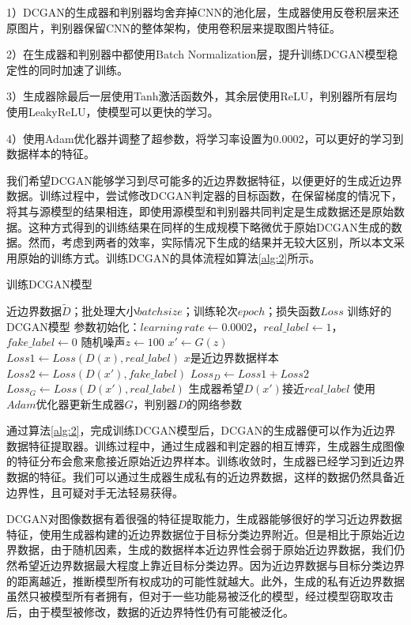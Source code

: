 1）DCGAN的生成器和判别器均舍弃掉CNN的池化层，生成器使用反卷积层来还原图片，判别器保留CNN的整体架构，使用卷积层来提取图片特征。

2）在生成器和判别器中都使用Batch Normalization层，提升训练DCGAN模型稳定性的同时加速了训练。

3）生成器除最后一层使用Tanh激活函数外，其余层使用ReLU，判别器所有层均使用LeakyReLU，使模型可以更快的学习。

4）使用Adam优化器并调整了超参数，将学习率设置为0.0002，可以更好的学习到数据样本的特征。

我们希望DCGAN能够学习到尽可能多的近边界数据特征，以便更好的生成近边界数据。训练过程中，尝试修改DCGAN判定器的目标函数，在保留梯度的情况下，将其与源模型的结果相连，即使用源模型和判别器共同判定是生成数据还是原始数据。这种方式得到的训练结果在同样的生成规模下略微优于原始DCGAN生成的数据。然而，考虑到两者的效率，实际情况下生成的结果并无较大区别，所以本文采用原始的训练方式。训练DCGAN的具体流程如算法\ref{alg:2}所示。

\begin{algorithm}[!h] 
	\caption{训练DCGAN模型}
	\label{alg:2}
	\begin{algorithmic}[1]
		
		\Require 近边界数据$\tilde{D}$；批处理大小$batchsize$；训练轮次$epoch$；损失函数$Loss$
		\Ensure 训练好的DCGAN模型
		\State 参数初始化：$learning \ rate \gets 0.0002$，$real\_label \gets 1$，$fake\_label \gets 0$
		\State 随机噪声$z \gets 100$ 
		\State $x' \gets G(z)$
		\State $Loss1 \gets Loss(D(x), real\_label)$  \Comment $x$是近边界数据样本
		\State $Loss2 \gets Loss(D(x'), fake\_label)$
		\State $Loss_D \gets Loss1 + Loss2$
		\State $Loss_G \gets Loss(D(x'), real\_label)$ \Comment 生成器希望$D(x') $接近$real\_label$
		\State 使用$Adam$优化器更新生成器$G$，判别器$D$的网络参数
		\EndFor
	\end{algorithmic}
\end{algorithm}

通过算法\ref{alg:2}，完成训练DCGAN模型后，DCGAN的生成器便可以作为近边界数据特征提取器。训练过程中，通过生成器和判定器的相互博弈，生成器生成图像的特征分布会愈来愈接近原始近边界样本。训练收敛时，生成器已经学习到近边界数据的特征。我们可以通过生成器生成私有的近边界数据，这样的数据仍然具备近边界性，且可疑对手无法轻易获得。

DCGAN对图像数据有着很强的特征提取能力，生成器能够很好的学习近边界数据特征，使用生成器构建的近边界数据位于目标分类边界附近。但是相比于原始近边界数据，由于随机因素，生成的数据样本近边界性会弱于原始近边界数据，我们仍然希望近边界数据最大程度上靠近目标分类边界。因为近边界数据与目标分类边界的距离越近，推断模型所有权成功的可能性就越大。此外，生成的私有近边界数据虽然只被模型所有者拥有，但对于一些功能易被泛化的模型，经过模型窃取攻击后，由于模型被修改，数据的近边界特性仍有可能被泛化。

